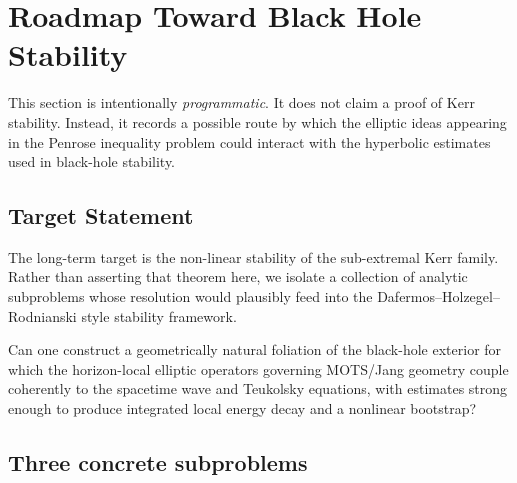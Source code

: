 \section{Roadmap Toward Black Hole Stability}
\label{sec:bh_stability}

This section is intentionally \emph{programmatic}. It does not claim a proof of Kerr stability. Instead, it records a possible route by which the elliptic ideas appearing in the Penrose inequality problem could interact with the hyperbolic estimates used in black-hole stability.

\subsection{Target Statement}

The long-term target is the non-linear stability of the sub-extremal Kerr family. Rather than asserting that theorem here, we isolate a collection of analytic subproblems whose resolution would plausibly feed into the Dafermos--Holzegel--Rodnianski style stability framework.

\begin{openproblem}\label{op:HyperbolicRealization}
Can one construct a geometrically natural foliation of the black-hole exterior for which the horizon-local elliptic operators governing MOTS/Jang geometry couple coherently to the spacetime wave and Teukolsky equations, with estimates strong enough to produce integrated local energy decay and a nonlinear bootstrap?
\end{openproblem}

\subsection{Three concrete subproblems}

